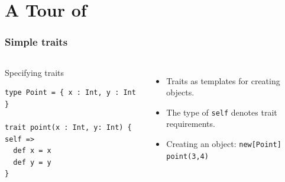 \documentclass{beamer}
\begin{document}







\section{A Tour of \name}

\begin{frame}[fragile]
  \frametitle{Simple traits}


\begin{columns}[t]

\begin{exampleblock}{Specifying traits}

\begin{lstlisting}
type Point = { x : Int, y : Int }

trait point(x : Int, y: Int) { self =>
  def x = x
  def y = y
}
\end{lstlisting}

\end{exampleblock}




\begin{itemize}
\item Traits as templates for creating objects.
\item The type of \lstinline{self} denotes trait requirements.
\item Creating an object: \lstinline{new[Point] point(3,4)}
\end{itemize}


\end{columns}


\end{frame}
\end{document}
